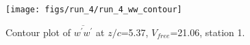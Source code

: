 \begin{figure}[H]
\centering
\texttt{[image: figs/run\_4/run\_4\_ww\_contour]}
\caption{Contour plot of $\overline{w^\prime w^\prime}$ at $z/c$=5.37, $V_{free}$=21.06, station 1.}
\label{fig:run_4_ww_contour}
\end{figure}


